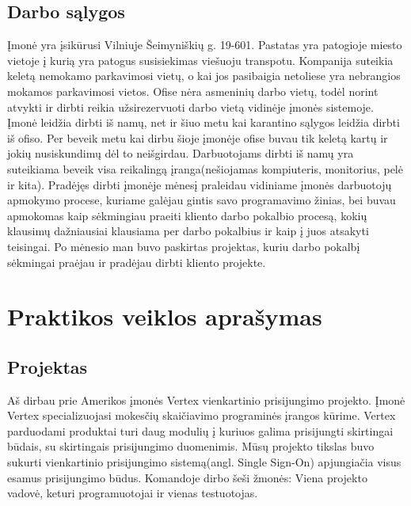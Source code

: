 \documentclass{VUMIFPSkursinis}
\begin{document}
	\subsection{Darbo sąlygos}
			Įmonė yra įsikūrusi Vilniuje Šeimyniškių g. 19-601.
			Pastatas yra patogioje miesto vietoje į kurią yra patogus susisiekimas viešuoju transpotu.
			Kompanija suteikia keletą nemokamo parkavimosi vietų, o kai jos pasibaigia netoliese yra nebrangios mokamos
			parkavimosi vietos.
			Ofise nėra asmeninių darbo vietų, todėl norint atvykti ir dirbti reikia užsirezervuoti darbo vietą vidinėje
			įmonės sistemoje.
			Įmonė leidžia dirbti iš namų, net ir šiuo metu kai karantino sąlygos leidžia dirbti iš ofiso.
			Per beveik metu kai dirbu šioje įmonėje ofise buvau tik keletą kartų ir jokių nusiskundimų dėl to neišgirdau.
			Darbuotojams dirbti iš namų yra suteikiama beveik visa reikalingą įranga(nešiojamas kompiuteris, monitorius, pelė ir kita).
			Pradėjęs dirbti įmonėje mėnesį praleidau vidiniame įmonės darbuotojų apmokymo procese, kuriame galėjau 
			gintis savo programavimo žinias, bei buvau apmokomas kaip sėkmingiau praeiti kliento darbo pokalbio procesą, 
			kokių klausimų dažniausiai klausiama per darbo pokalbius ir kaip į juos atsakyti teisingai.
			Po mėnesio man buvo paskirtas projektas, kuriu darbo pokalbį sėkmingai praėjau ir pradėjau dirbti kliento projekte.
		
		
\section{Praktikos veiklos aprašymas}
	\subsection{Projektas}
		Aš dirbau prie Amerikos įmonės Vertex vienkartinio prisijungimo projekto. Įmonė Vertex specializuojasi mokesčių
		skaičiavimo programinės įrangos kūrime. Vertex parduodami produktai turi daug modulių į kuriuos galima prisijungti skirtingai būdais, su skirtingais prisijungimo duomenimis. Mūsų projekto tikslas buvo sukurti vienkartinio 
		prisijungimo sistemą(angl. Single Sign-On) apjungiačia visus esamus prisijungimo būdus.
		Komandoje dirbo šeši žmonės: Viena projekto vadovė, keturi programuotojai ir vienas testuotojas.
		
\end{document}
